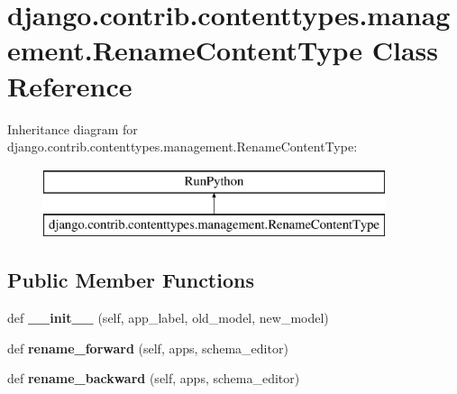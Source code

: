 \hypertarget{classdjango_1_1contrib_1_1contenttypes_1_1management_1_1_rename_content_type}{}\section{django.\+contrib.\+contenttypes.\+management.\+Rename\+Content\+Type Class Reference}
\label{classdjango_1_1contrib_1_1contenttypes_1_1management_1_1_rename_content_type}
Inheritance diagram for django.\+contrib.\+contenttypes.\+management.\+Rename\+Content\+Type\+:\begin{figure}[H]
\begin{center}
\leavevmode
\includegraphics[height=2.000000cm]{classdjango_1_1contrib_1_1contenttypes_1_1management_1_1_rename_content_type}
\end{center}
\end{figure}
\subsection*{Public Member Functions}
\begin{DoxyCompactItemize}
\item 
\mbox{\label{classdjango_1_1contrib_1_1contenttypes_1_1management_1_1_rename_content_type_a8159b17096d099c12d2979eb09b15f40}} 
def {\bfseries \+\_\+\+\_\+init\+\_\+\+\_\+} (self, app\+\_\+label, old\+\_\+model, new\+\_\+model)
\item 
\mbox{\label{classdjango_1_1contrib_1_1contenttypes_1_1management_1_1_rename_content_type_a5a8d2d2bd543ddc4ade591c2ef84c905}} 
def {\bfseries rename\+\_\+forward} (self, apps, schema\+\_\+editor)
\item 
\mbox{\label{classdjango_1_1contrib_1_1contenttypes_1_1management_1_1_rename_content_type_aaa12a04d3a9fa5209dc7a936d4d7be0c}} 
def {\bfseries rename\+\_\+backward} (self, apps, schema\+\_\+editor)
\end{DoxyCompactItemize}
